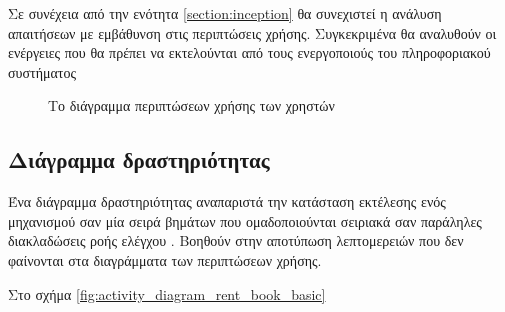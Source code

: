 \documentclass{assignment}
\begin{document}
Σε συνέχεια από την ενότητα \ref{section:inception} θα συνεχιστεί η ανάλυση απαιτήσεων με εμβάθυνση στις περιπτώσεις χρήσης. Συγκεκριμένα θα αναλυθούν οι ενέργειες που θα πρέπει να εκτελούνται από τους ενεργοποιούς του πληροφοριακού συστήματος 

\begin{landscape}
\begin{figure}
\begin{center}
\caption{Το διάγραμμα περιπτώσεων χρήσης των χρηστών}
\label{fig:usecase_diagram_Users}
\end{center}
\end{figure}
\end{landscape}

\subsection{Διάγραμμα δραστηριότητας}

Ένα διάγραμμα δραστηριότητας αναπαριστά την κατάσταση εκτέλεσης ενός μηχανισμού σαν μία σειρά βημάτων που ομαδοποιούνται σειριακά σαν παράληλες διακλαδώσεις ροής ελέγχου \cite{virvou_uml}. Βοηθούν στην αποτύπωση λεπτομερειών που δεν φαίνονται στα διαγράμματα των περιπτώσεων χρήσης.

Στο σχήμα \ref{fig:activity_diagram_rent_book_basic}
\end{document}
